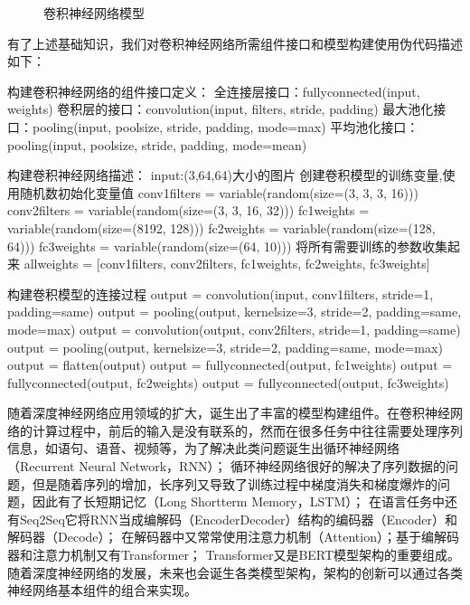 \documentclass[letterpaper,10pt,english]{sphinxmanual}
\let\sphinxpxdimen\pdfpxdimen\else\newdimen\sphinxpxdimen
\begin{document}
\begin{figure}[H]
\centering
\capstart

\noindent\sphinxincludegraphics[width=800\sphinxpxdimen]{{nn_network}.svg}
\caption{卷积神经网络模型}\label{\detokenize{chapter_programming_interface/neural_network_layer:id11}}\label{\detokenize{chapter_programming_interface/neural_network_layer:nn-network}}\end{figure}

\sphinxAtStartPar
有了上述基础知识，我们对卷积神经网络所需组件接口和模型构建使用伪代码描述如下：

\begin{sphinxVerbatim}[commandchars=\\\{\}]
\PYGZsh{} 构建卷积神经网络的组件接口定义：
全连接层接口：fully\PYGZus{}connected(input, weights)
卷积层的接口：convolution(input, filters, stride, padding)
最大池化接口：pooling(input, pool\PYGZus{}size, stride, padding, mode=\PYGZsq{}max\PYGZsq{})
平均池化接口：pooling(input, pool\PYGZus{}size, stride, padding, mode=\PYGZsq{}mean\PYGZsq{})

\PYGZsh{} 构建卷积神经网络描述：
input:(3,64,64)大小的图片
\PYGZsh{} 创建卷积模型的训练变量,使用随机数初始化变量值
conv1\PYGZus{}filters = variable(random(size=(3, 3, 3, 16)))
conv2\PYGZus{}filters = variable(random(size=(3, 3, 16, 32)))
fc1\PYGZus{}weights = variable(random(size=(8192, 128)))
fc2\PYGZus{}weights = variable(random(size=(128, 64)))
fc3\PYGZus{}weights = variable(random(size=(64, 10)))
\PYGZsh{} 将所有需要训练的参数收集起来
all\PYGZus{}weights = [conv1\PYGZus{}filters, conv2\PYGZus{}filters, fc1\PYGZus{}weights, fc2\PYGZus{}weights, fc3\PYGZus{}weights]

\PYGZsh{} 构建卷积模型的连接过程
output = convolution(input, conv1\PYGZus{}filters, stride=1, padding=\PYGZsq{}same\PYGZsq{})
output = pooling(output, kernel\PYGZus{}size=3, stride=2, padding=\PYGZsq{}same\PYGZsq{}, mode=\PYGZsq{}max\PYGZsq{})
output = convolution(output, conv2\PYGZus{}filters, stride=1, padding=\PYGZsq{}same\PYGZsq{})
output = pooling(output, kernel\PYGZus{}size=3, stride=2, padding=\PYGZsq{}same\PYGZsq{}, mode=\PYGZsq{}max\PYGZsq{})
output = flatten(output)
output = fully\PYGZus{}connected(output, fc1\PYGZus{}weights)
output = fully\PYGZus{}connected(output, fc2\PYGZus{}weights)
output = fully\PYGZus{}connected(output, fc3\PYGZus{}weights)
\end{sphinxVerbatim}

\sphinxAtStartPar
随着深度神经网络应用领域的扩大，诞生出了丰富的模型构建组件。在卷积神经网络的计算过程中，前后的输入是没有联系的，然而在很多任务中往往需要处理序列信息，如语句、语音、视频等，为了解决此类问题诞生出循环神经网络（Recurrent
Neural Network，RNN）；
循环神经网络很好的解决了序列数据的问题，但是随着序列的增加，长序列又导致了训练过程中梯度消失和梯度爆炸的问题，因此有了长短期记忆（Long
Short\sphinxhyphen{}term Memory，LSTM）；
在语言任务中还有Seq2Seq它将RNN当成编解码（Encoder\sphinxhyphen{}Decoder）结构的编码器（Encoder）和解码器（Decode）；
在解码器中又常常使用注意力机制（Attention）；基于编解码器和注意力机制又有Transformer；
Transformer又是BERT模型架构的重要组成。随着深度神经网络的发展，未来也会诞生各类模型架构，架构的创新可以通过各类神经网络基本组件的组合来实现。
\end{document}
